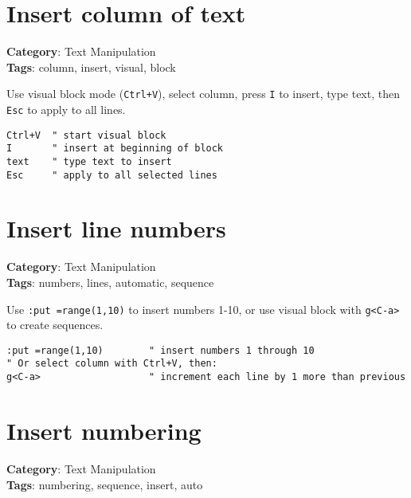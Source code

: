{{{{{{{{{{{{{\section{Insert column of text}

\textbf{Category}: Text Manipulation\\ \textbf{Tags}: column, insert, visual, block
\vspace{0.5cm}

Use visual block mode ({\footnotesize \Verb§Ctrl+V§}), select column, press {\footnotesize \Verb§I§} to insert, type text, then {\footnotesize \Verb§Esc§} to apply to all lines.

\begin{Exa*}{}
\begin{Verbatim}[fontsize=\footnotesize, breaklines, breakanywhere]
Ctrl+V  " start visual block
I       " insert at beginning of block
text    " type text to insert
Esc     " apply to all selected lines
\end{Verbatim}
\end{Exa*}

\section{Insert line numbers}

\textbf{Category}: Text Manipulation\\ \textbf{Tags}: numbers, lines, automatic, sequence
\vspace{0.5cm}

Use {\footnotesize \Verb§:put =range(1,10)§} to insert numbers 1-10, or use visual block with {\footnotesize \Verb§g<C-a>§} to create sequences.

\begin{Exa*}{}
\begin{Verbatim}[fontsize=\footnotesize, breaklines, breakanywhere]
:put =range(1,10)        " insert numbers 1 through 10
" Or select column with Ctrl+V, then:
g<C-a>                   " increment each line by 1 more than previous
\end{Verbatim}
\end{Exa*}

\section{Insert numbering}

\textbf{Category}: Text Manipulation\\ \textbf{Tags}: numbering, sequence, insert, auto
\vspace{0.5cm}

}}}}}}}}}}}}}
